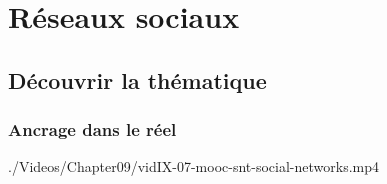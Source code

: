 \section[Réseaux sociaux]{Réseaux sociaux}
\label{sec:IX.3}

\subsection[Découvrir la thématique]{Découvrir la thématique}
\label{sub:IX.3.1}


\subsubsection[Ancrage dans le réel]{Ancrage dans le réel}
\label{subsub:IX.3.1.1}


\begin{marginvideo}
		{./Videos/Chapter09/vidIX-07-mooc-snt-social-networks.mp4}%
\end{marginvideo}

